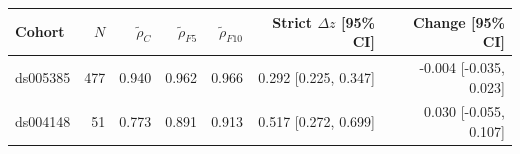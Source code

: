 \begin{tabular}{lrrrrrr}
Cohort & $N$ & $\tilde\rho_C$ & $\tilde\rho_{F5}$ & $\tilde\rho_{F10}$ & Strict $\Delta z$ [95\% CI] & Change [95\% CI] \\
\hline
ds005385 & 477 & 0.940 & 0.962 & 0.966 & 0.292 [0.225, 0.347] & -0.004 [-0.035, 0.023] \\
ds004148 & 51 & 0.773 & 0.891 & 0.913 & 0.517 [0.272, 0.699] & 0.030 [-0.055, 0.107] \\
\end{tabular}
